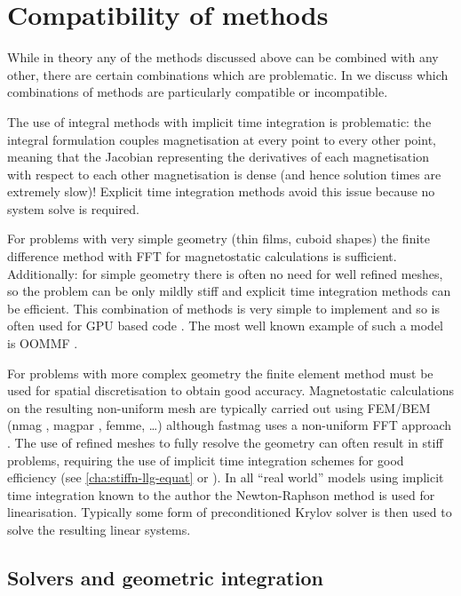 \section{Compatibility of methods}
\label{sec:comp-meth}

While in theory any of the methods discussed above can be combined with any other, there are certain combinations which are problematic.
In  we discuss which combinations of methods are particularly compatible or incompatible.

The use of integral methods with implicit time integration is problematic: the integral formulation couples magnetisation at every point to every other point, meaning that the Jacobian representing the derivatives of each magnetisation with respect to each other magnetisation is dense (and hence solution times are extremely slow)!
Explicit time integration methods avoid this issue because no system solve is required.

For problems with very simple geometry (\ie thin films, cuboid shapes) the finite difference method with FFT for magnetostatic calculations is sufficient.
Additionally: for simple geometry there is often no need for well refined meshes, so the problem can be only mildly stiff and explicit time integration methods can be efficient.
This combination of methods is very simple to implement and so is often used for GPU based code \cite{Vansteenkiste2011}.
The most well known example of such a model is OOMMF \cite{oommf-website}.

For problems with more complex geometry the finite element method must be used for spatial discretisation to obtain good accuracy. 
Magnetostatic calculations on the resulting non-uniform mesh are typically carried out using FEM/BEM (nmag \cite{Fischbacher2007}, magpar \cite{Scholz2003}, femme, \ldots) although fastmag uses a non-uniform FFT approach \cite{Chang2011}.
The use of refined meshes to fully resolve the geometry can often result in stiff problems, requiring the use of implicit time integration schemes for good efficiency (see \cref{cha:stiffn-llg-equat} or \cite{Shepherd2014}).
In all ``real world'' models using implicit time integration known to the author the Newton-Raphson method is used for linearisation.
Typically some form of preconditioned Krylov solver is then used to solve the resulting linear systems.


\subsection{Solvers and geometric integration}

